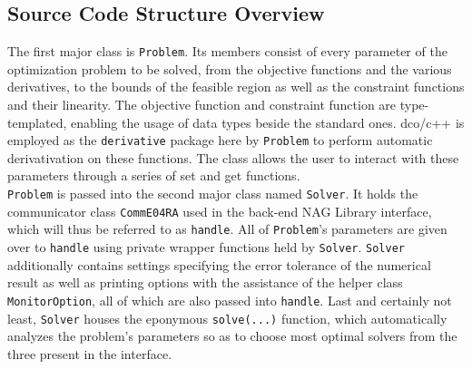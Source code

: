 \documentclass{book}
\begin{document}
\subsection{Source Code Structure Overview}
The first major class is \texttt{Problem}. Its members consist of every parameter of the optimization problem to be solved, from the objective functions and the various derivatives, to the bounds of the feasible region as well as the constraint functions and their linearity. The objective function and constraint function are type-templated, enabling the usage of data types beside the standard ones. dco/c++ is employed as the \texttt{derivative} package here by \texttt{Problem} to perform automatic derivativation on these functions. The class allows the user to interact with these parameters through a series of set and get functions.\\
\newline
\texttt{Problem} is passed into the second major class named \texttt{Solver}. It holds the communicator class \texttt{CommE04RA} used in the back-end NAG Library interface, which will thus be referred to as \texttt{handle}. All of \texttt{Problem}’s parameters are given over to \texttt{handle} using private wrapper functions held by \texttt{Solver}. \texttt{Solver} additionally contains settings specifying the error tolerance of the numerical result as well as printing options with the assistance of the helper class \texttt{MonitorOption}, all of which are also passed into \texttt{handle}. Last and certainly not least, \texttt{Solver} houses the eponymous \texttt{solve(...)} function, which automatically analyzes the problem’s parameters so as to choose most optimal solvers from the three present in the interface.
\end{document}
